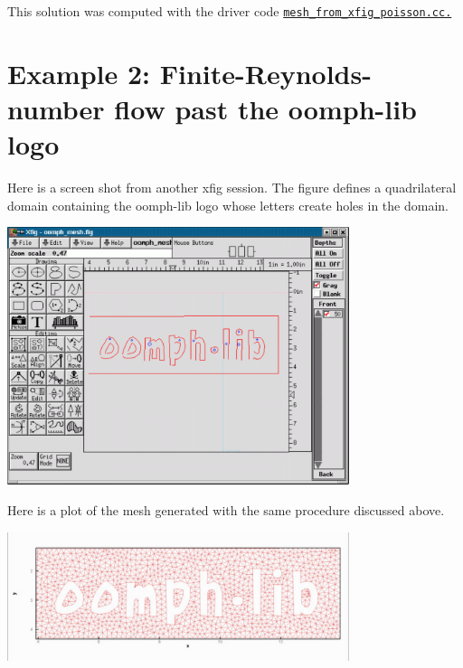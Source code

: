 This solution was computed with the driver code \href{../../../../demo_drivers/meshing/mesh_from_xfig_triangle/mesh_from_xfig_poisson.cc}{\tt mesh\+\_\+from\+\_\+xfig\+\_\+poisson.\+cc.} 

 

\hypertarget{index_oomph_nst}{}\section{Example 2\+: Finite-\/\+Reynolds-\/number flow past the oomph-\/lib logo}\label{index_oomph_nst}
Here is a screen shot from another xfig session. The figure defines a quadrilateral domain containing the oomph-\/lib logo whose letters create holes in the domain.

 
\begin{DoxyImage}
\includegraphics[width=0.75\textwidth]{oomph_screen_shot}
\end{DoxyImage}


Here is a plot of the mesh generated with the same procedure discussed above.

 
\begin{DoxyImage}
\includegraphics[width=0.75\textwidth]{oomph_mesh}
\end{DoxyImage}


